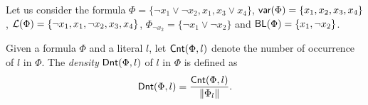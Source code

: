 Let us consider the formula $\Phi=\{\neg x_1 \vee \neg x_2, x_1, x_3 \vee x_4\}$,
$\textsf{var}(\Phi)=\{x_1, x_2, x_3, x_4\}$, ${\cal L}(\Phi)=\{\neg x_1, x_1, \neg x_2, x_3, x_4\}$, $\Phi_{\neg x_2}=\{\neg x_1 \vee \neg x_2\}$ and $\textsf{BL}(\Phi)=\{x_1, \neg x_2\}$.

Given a formula $\Phi$ and a literal $l$, let $\textsf{Cnt}(\Phi,l)$ denote the number of occurrence of $l$ in $\Phi$.
The \emph{density} $\textsf{Dnt}(\Phi,l)$ of $l$ in $\Phi$ is defined as
\[
\textsf{Dnt}(\Phi, l)=\frac{\textsf{Cnt}(\Phi,l)}{\|\Phi_l\|}.
\]



